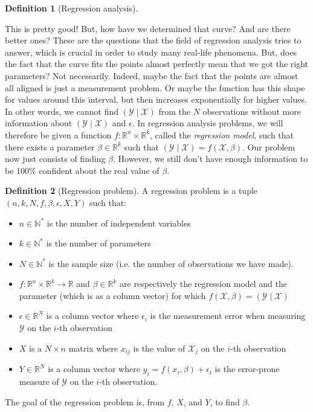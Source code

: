 \documentclass{article}
\theoremstyle{definition}
\newtheorem{definition}{Definition}[section]
\theoremstyle{remark}
\theoremstyle{example}
\begin{document}
\begin{definition}[Regression analysis]
\begin{figure}[h!]
		\centering
		\scalebox{0.9}{}
\end{figure}

		This is pretty good! But, how have we determined that curve? And are there better ones? These are the questions that the field of regression analysis tries to answer, which is crucial in order to study many real-life phenomena. But, does the fact that the curve fits the points almost perfectly mean that we got the right parameters? Not necessarily. Indeed, maybe the fact that the points are almost all aligned is just a measurement problem. Or maybe the function has this shape for values around this interval, but then increases exponentially for higher values. In other words, we cannot find $(\mathcal{Y} \mid \mathcal{X})$ from the $N$ observations without more information about $(\mathcal{Y} \mid \mathcal{X})$ and $\epsilon$. In regression analysis problems, we will therefore be given a function $f : \mathbb{R}^n \times \mathbb{R}^k$, called the \textit{regression model}, such that there exists a parameter $\beta \in \mathbb{R}^k$ such that $(\mathcal{Y} \mid \mathcal{X}) = f(\mathcal{X}, \beta)$. Our problem now just consists of finding $\beta$. However, we still don't have enough information to be $100\%$ confident about the real value of $\beta$.
\end{definition}

\begin{definition}[Regression problem]
		A regression problem is a tuple $(n, k, N, f, \beta, \epsilon, X, Y)$ such that:
		\begin{itemize}
				\item $n \in \mathbb{N}^*$ is the number of independent variables
				\item $k \in \mathbb{N}^*$ is the number of parameters
				\item $N \in \mathbb{N}^*$ is the sample size (i.e. the number of observations we have made).
				\item $f : \mathbb{R}^n \times \mathbb{R}^k \rightarrow \mathbb{R}$ and $\beta \in \mathbb{R}^k$ are respectively the regression model and the parameter (which is as a column vector) for which $f(\mathcal{X}, \beta) = (\mathcal{Y} \mid \mathcal{X})$
				\item $\epsilon \in \mathbb{R}^N$ is a column vector where $\epsilon_i$ is the measurement error when measuring $\mathcal{Y}$ on the $i$-th observation
				\item $X$ is a $N \times n$ matrix where $x_{ij}$ is the value of $\mathcal{X}_j$ on the $i$-th observation
				\item $Y \in \mathbb{R}^N$ is a column vector where $y_i = f(x_i, \beta) + \epsilon_i$ is the error-prone measure of $\mathcal{Y}$ on the $i$-th observation.
		\end{itemize}
		The goal of the regression problem is, from $f$, $X$, and $Y$, to find $\beta$.
\end{definition}
\end{document}

